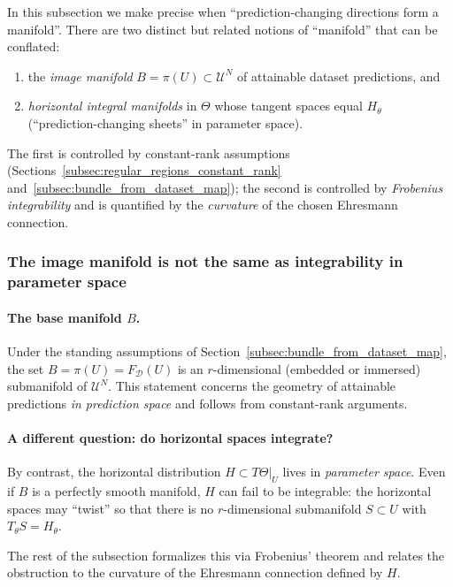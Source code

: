 In this subsection we make precise when ``prediction-changing directions form a manifold''.
There are two distinct but related notions of ``manifold'' that can be conflated:
\begin{enumerate}\setlength{\itemsep}{3pt}
\item the \emph{image manifold} $B=\pi(U)\subset\mathcal U^N$ of attainable dataset predictions, and
\item \emph{horizontal integral manifolds} in $\Theta$ whose tangent spaces equal $H_\theta$
(``prediction-changing sheets'' in parameter space).
\end{enumerate}
The first is controlled by constant-rank assumptions (Sections~\ref{subsec:regular_regions_constant_rank}
and~\ref{subsec:bundle_from_dataset_map}); the second is controlled by \emph{Frobenius integrability}
and is quantified by the \emph{curvature} of the chosen Ehresmann connection.

\subsubsection{The image manifold is not the same as integrability in parameter space}

\paragraph{The base manifold $B$.}
Under the standing assumptions of Section~\ref{subsec:bundle_from_dataset_map}, the set
$B=\pi(U)=F_{\mathcal D}(U)$ is an $r$-dimensional (embedded or immersed) submanifold of $\mathcal U^N$.
This statement concerns the geometry of attainable predictions \emph{in prediction space} and follows
from constant-rank arguments.

\paragraph{A different question: do horizontal spaces integrate?}
By contrast, the horizontal distribution $H\subset T\Theta|_U$ lives in \emph{parameter space}.
Even if $B$ is a perfectly smooth manifold, $H$ can fail to be integrable:
the horizontal spaces may ``twist'' so that there is no $r$-dimensional submanifold $S\subset U$
with $T_\theta S = H_\theta$.

The rest of the subsection formalizes this via Frobenius' theorem and relates the obstruction
to the curvature of the Ehresmann connection defined by $H$.

